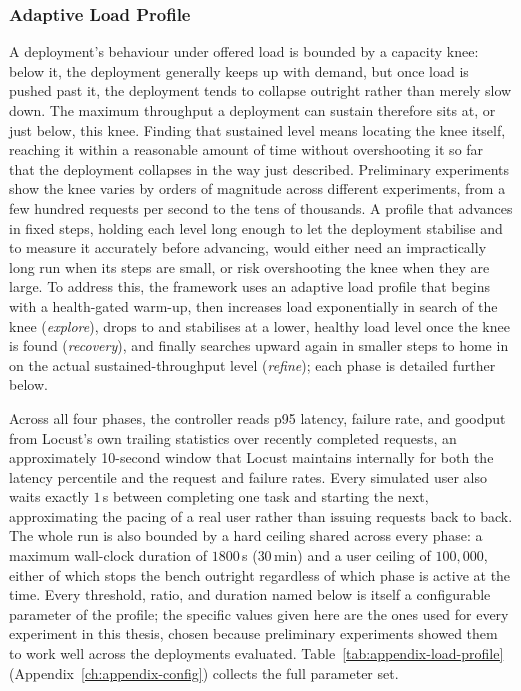 \subsubsection{Adaptive Load Profile}
\label{sec:methods-load-profile}

A deployment's behaviour under offered load is bounded by a capacity
knee: below it, the deployment generally keeps up with demand, but once
load is pushed past it, the deployment tends to collapse outright rather
than merely slow down. The maximum throughput a deployment can sustain
therefore sits at, or just below, this knee. Finding that sustained level
means locating the knee itself, reaching it within a reasonable amount of
time without overshooting it so far that the deployment collapses in the
way just described. Preliminary experiments show the knee varies by
orders of magnitude across different experiments, from a few hundred
requests per second to the tens of thousands. A profile that advances in
fixed steps, holding each level long enough to let the deployment
stabilise and to measure it accurately before advancing, would either
need an impractically long run when its steps are small, or risk
overshooting the knee when they are large. To address this, the
framework uses an adaptive load profile that begins with a health-gated
warm-up, then increases load exponentially in search of the knee
(\emph{explore}), drops to and stabilises at a lower, healthy load level
once the knee is found (\emph{recovery}), and finally searches upward
again in smaller steps to home in on the actual sustained-throughput
level (\emph{refine}); each phase is detailed further below.

Across all four phases, the controller reads p95 latency, failure rate,
and goodput from Locust's own trailing statistics over recently completed
requests, an approximately 10-second window that Locust maintains
internally for both the latency percentile and the request and failure
rates. Every simulated user also waits exactly
$1$\,s between completing one task and starting the next, approximating
the pacing of a real user rather than issuing requests back to back. The
whole run is also bounded by a hard ceiling shared across every phase: a
maximum wall-clock duration of $1800$\,s ($30$\,min) and a user ceiling
of $100{,}000$, either of which stops the bench outright regardless of
which phase is active at the time.
Every threshold, ratio, and duration named
below is itself a configurable parameter of the profile; the specific
values given here are the ones used for every experiment in this thesis,
chosen because preliminary experiments showed them to work well across
the deployments evaluated. Table~\ref{tab:appendix-load-profile}
(Appendix~\ref{ch:appendix-config}) collects the full parameter set.


